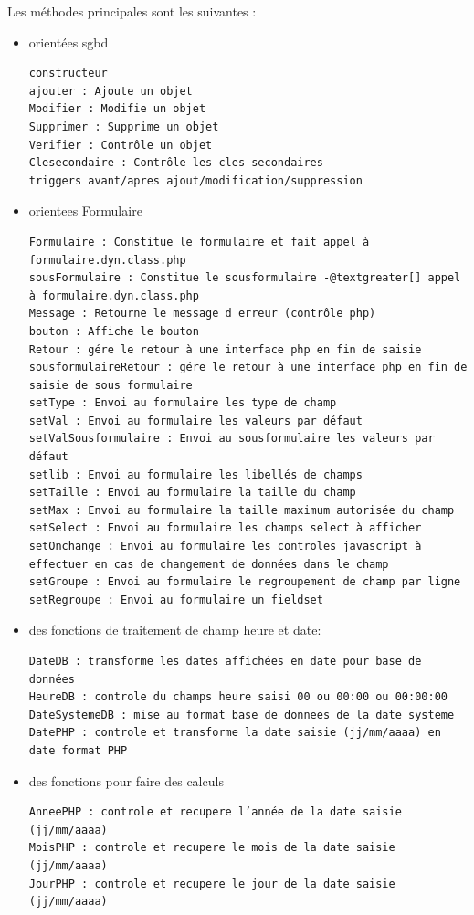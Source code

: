 \documentclass[letterpaper,10pt,french]{manual}
\begin{document}
Les méthodes principales sont les suivantes :
\begin{itemize}
\item {} 
orientées sgbd

\begin{Verbatim}[commandchars=@\[\]]
constructeur
ajouter : Ajoute un objet
Modifier : Modifie un objet
Supprimer : Supprime un objet
Verifier : Contrôle un objet
Clesecondaire : Contrôle les cles secondaires
triggers avant/apres ajout/modification/suppression
\end{Verbatim}

\item {} 
orientees Formulaire

\begin{Verbatim}[commandchars=@\[\]]
Formulaire : Constitue le formulaire et fait appel à formulaire.dyn.class.php
sousFormulaire : Constitue le sousformulaire -@textgreater[] appel à formulaire.dyn.class.php
Message : Retourne le message d erreur (contrôle php)
bouton : Affiche le bouton
Retour : gére le retour à une interface php en fin de saisie
sousformulaireRetour : gére le retour à une interface php en fin de saisie de sous formulaire
setType : Envoi au formulaire les type de champ
setVal : Envoi au formulaire les valeurs par défaut
setValSousformulaire : Envoi au sousformulaire les valeurs par défaut
setlib : Envoi au formulaire les libellés de champs
setTaille : Envoi au formulaire la taille du champ
setMax : Envoi au formulaire la taille maximum autorisée du champ
setSelect : Envoi au formulaire les champs select à afficher
setOnchange : Envoi au formulaire les controles javascript à effectuer en cas de changement de données dans le champ
setGroupe : Envoi au formulaire le regroupement de champ par ligne
setRegroupe : Envoi au formulaire un fieldset
\end{Verbatim}

\item {} 
des fonctions de traitement de champ heure et date:

\begin{Verbatim}[commandchars=@\[\]]
DateDB : transforme les dates affichées en date pour base de données
HeureDB : controle du champs heure saisi 00 ou 00:00 ou 00:00:00
DateSystemeDB : mise au format base de donnees de la date systeme
DatePHP : controle et transforme la date saisie (jj/mm/aaaa) en date format PHP
\end{Verbatim}

\item {} 
des fonctions pour faire des calculs

\begin{Verbatim}[commandchars=@\[\]]
AnneePHP : controle et recupere l’année de la date saisie (jj/mm/aaaa)
MoisPHP : controle et recupere le mois de la date saisie (jj/mm/aaaa)
JourPHP : controle et recupere le jour de la date saisie (jj/mm/aaaa)
\end{Verbatim}

\end{itemize}
\end{document}
